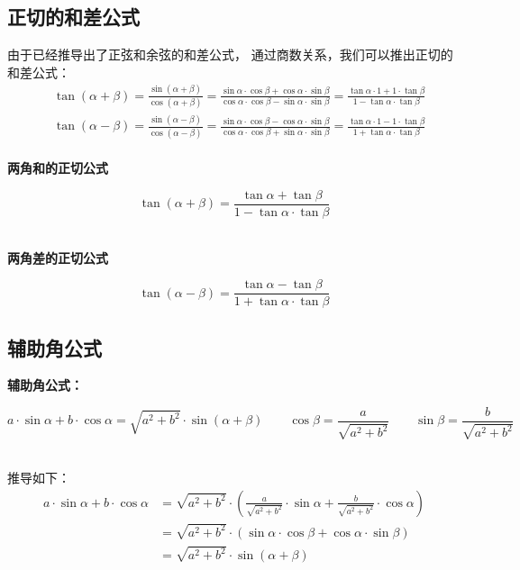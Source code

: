 \documentclass[UTF8]{ctexart}
\begin{document}
\subsection{正切的和差公式}
    由于已经推导出了正弦和余弦的和差公式，
    通过商数关系，我们可以推出正切的和差公式：\\
    \setcounter{equation}{0}
    \begin{align}
        &\tan{(\alpha+\beta)}
        =\frac{\sin{(\alpha+\beta)}}{\cos{(\alpha+\beta)}}
        =\frac{\sin{\alpha}\cdot\cos{\beta}+\cos{\alpha}\cdot\sin{\beta}}{\cos{\alpha}\cdot\cos{\beta}-\sin{\alpha}\cdot\sin{\beta}}
        =\frac{\tan{\alpha}\cdot1+1\cdot\tan{\beta}}{1-\tan{\alpha}\cdot\tan{\beta}}\\[4mm]
        &\tan{(\alpha-\beta)}
        =\frac{\sin{(\alpha-\beta)}}{\cos{(\alpha-\beta)}}
        =\frac{\sin{\alpha}\cdot\cos{\beta}-\cos{\alpha}\cdot\sin{\beta}}{\cos{\alpha}\cdot\cos{\beta}+\sin{\alpha}\cdot\sin{\beta}}
        =\frac{\tan{\alpha}\cdot1-1\cdot\tan{\beta}}{1+\tan{\alpha}\cdot\tan{\beta}}
    \end{align}\\
    \textbf{两角和的正切公式}
    \begin{large}
        \begin{equation*}
            \tan{(\alpha+\beta)}=\frac{\tan{\alpha}+\tan{\beta}}{1-\tan{\alpha}\cdot\tan{\beta}}
        \end{equation*}\\
    \end{large}
    \textbf{两角差的正切公式}
    \begin{large}
        \begin{equation*}
            \tan{(\alpha-\beta)}=\frac{\tan{\alpha}-\tan{\beta}}{1+\tan{\alpha}\cdot\tan{\beta}}
        \end{equation*} 
    \end{large}

\newpage

\subsection{辅助角公式}
    \textbf{辅助角公式：}
    \begin{large}
    \begin{equation*}
        a\cdot\sin{\alpha}+b\cdot\cos{\alpha}=\sqrt{a^2+b^2}\cdot\sin{(\alpha+\beta)}\qquad\cos{\beta}=\frac{a}{\sqrt{a^2+b^2}}\qquad\sin{\beta}=\frac{b}{\sqrt{a^2+b^2}}
    \end{equation*}        
    \end{large}\\
    推导如下：
    \setcounter{equation}{0}
    \begin{align}
        a\cdot\sin{\alpha}+b\cdot\cos{\alpha}
        &=\sqrt{a^2+b^2}\cdot\left(\frac{a}{\sqrt{a^2+b^2}}\cdot\sin{\alpha}+\frac{b}{\sqrt{a^2+b^2}}\cdot\cos{\alpha}\right)\\[3mm] 
        &=\sqrt{a^2+b^2}\cdot\left(\sin{\alpha}\cdot\cos{\beta}+\cos{\alpha}\cdot\sin{\beta}\right)\\[3mm]
        &=\sqrt{a^2+b^2}\cdot\sin{(\alpha+\beta)}
    \end{align}
\end{document}
